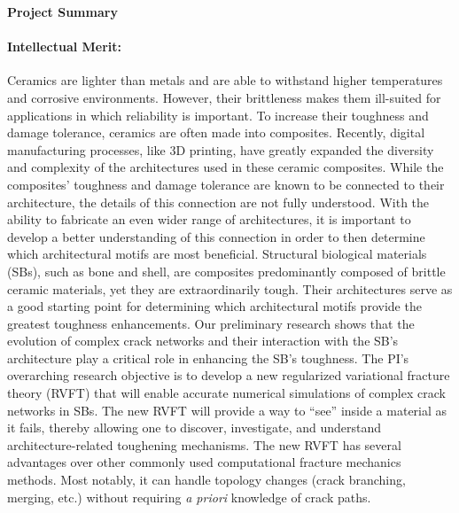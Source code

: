 \documentclass[10pt,letterpaper]{article}
\begin{document}
\begin{center}\textbf{\large{Project Summary}}\end{center}

\paragraph{Intellectual Merit:}
Ceramics are lighter than metals and are able to withstand higher temperatures and corrosive environments. However, their brittleness makes them ill-suited for applications in which reliability is important. To increase their toughness and damage tolerance, ceramics are often made into composites. Recently, digital manufacturing processes, like 3D printing, have greatly expanded the diversity and complexity of the architectures used in these ceramic composites. While the composites' toughness and damage tolerance are known to be connected to their architecture, the details of this connection are not fully understood. With the ability to fabricate an even wider range of architectures, it is important to develop a better understanding of this connection in order to then determine which architectural motifs are most beneficial.
%
Structural biological materials (SBs), such as bone and shell, are composites predominantly composed of brittle ceramic materials, yet they are extraordinarily tough. Their architectures serve as a good starting point for determining which architectural motifs provide the greatest toughness enhancements. Our preliminary research shows that the evolution of complex crack networks and their interaction with the SB's architecture play a critical role in enhancing the SB's toughness. The PI's overarching research objective is to develop a new regularized variational fracture theory (RVFT) that will enable accurate numerical simulations of complex crack networks in SBs.
%
The new RVFT will provide a way to ``see'' inside a material as it fails, thereby allowing one to discover, investigate, and understand architecture-related toughening mechanisms. The new RVFT has several advantages over other commonly used computational fracture mechanics methods. Most notably, it can handle topology changes (crack branching, merging, etc.) without requiring \textit{a priori} knowledge of crack paths.
\end{document}
